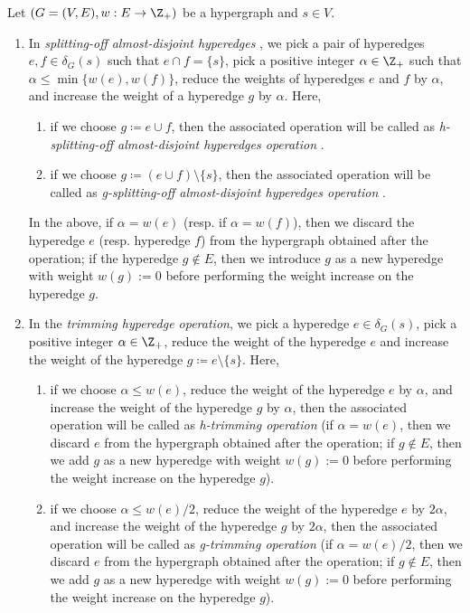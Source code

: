\iffalse
\begin{definition}\label{defn:splitting-off}
    Let $(G=(V, E), w: E\rightarrow \Z_+)$ be a hypergraph and $s\in V$. 
    \begin{enumerate}
        
        
        \item 
        In \emph{splitting-off almost-disjoint hyperedges} , we pick a pair of hyperedges $e, f\in \delta_G(s)$ such that $e\cap f=\{s\}$, pick a positive integer $\alpha \in \Z_+$ such that $\alpha\le \min\{w(e), w(f)\}$, reduce the weights of hyperedges $e$ and $f$ by $\alpha$, and increase the weight of a hyperedge $g$ by $\alpha$. Here, 
        \begin{enumerate}
            \item if we choose $g\coloneqq e \cup f$, then the associated operation will be called as \emph{h-splitting-off almost-disjoint hyperedges operation} .
            \item if we choose $g\coloneqq (e\cup f)\setminus \{s\}$, then the associated operation will be called as \emph{g-splitting-off almost-disjoint hyperedges operation} .
        \end{enumerate}
        In the above, if $\alpha=w(e)$ (resp. if $\alpha = w(f)$), then we discard the hyperedge $e$ (resp. hyperedge $f$) from the hypergraph obtained after the operation; if the hyperedge $g\not\in E$, then we introduce $g$ as a new hyperedge with weight $w(g) := 0$ before performing the weight increase on the hyperedge $g$.
    
        \item 
        In the \emph{trimming hyperedge operation}, we pick a hyperedge $e\in \delta_G(s)$, pick a positive integer $\alpha \in \Z_+$,
        reduce the weight of the hyperedge $e$ and 
        increase the weight of the hyperedge $g\coloneqq e\setminus \{s\}$. Here, 
        \begin{enumerate}
            \item if we choose $\alpha \le w(e)$, reduce the weight of the hyperedge $e$ by $\alpha$,  and increase the weight of the hyperedge $g$ by $\alpha$, then the associated operation will be called as \emph{h-trimming operation} (if $\alpha=w(e)$, then we discard $e$ from the hypergraph obtained after the operation; if $g\not\in E$, then we add $g$ as a new hyperedge with weight $w(g) := 0$ before performing the weight increase on the hyperedge $g$). 
            \item if we choose $\alpha \le w(e)/2$, reduce the weight of the hyperedge $e$ by $2\alpha$, and increase the weight of the hyperedge $g$ by $2\alpha$, then the associated operation will be called as \emph{g-trimming operation} (if $\alpha=w(e)/2$, then we discard $e$ from the hypergraph obtained after the operation; if $g\not\in E$, then we add $g$ as a new hyperedge with weight $w(g) := 0$ before performing the weight increase on the hyperedge $g$).  
        \end{enumerate}


\end{enumerate}
\end{definition}
